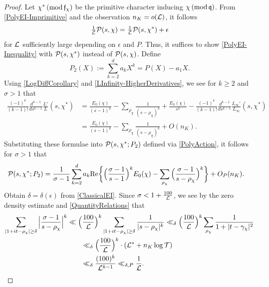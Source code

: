 \documentclass[12pt,psamsfonts]{amsart}
\theoremstyle{definition}
\theoremstyle{remark}
\numberwithin{equation}{section}
\begin{document}
\begin{proof} Let $\chi^* \, (\mathrm{mod} {\, \mathfrak{f}_{\chi}})$ be the primitive character inducing $\chi \, (\mathrm{mod} {\, \mathfrak{q}})$. From \cref{PolyEI-Imprimitive} and the observation $n_K = o(\mathcal{L})$, it follows
\[
\tfrac{1}{\mathcal{L}} \mathcal{P}(s,\chi) = \tfrac{1}{\mathcal{L}} \mathcal{P}(s,\chi^*) + \epsilon
\]
for $\mathcal{L}$ sufficiently large depending on $\epsilon$ and $P$. Thus, it suffices to show \eqref{PolyEI-Inequality} with $\mathcal{P}(s,\chi^*)$ instead of $\mathcal{P}(s,\chi)$. 
Define
\[
P_2(X) := \sum_{k=2}^d a_k X^k = P(X) - a_1X.
\]
Using \cref{LogDiffCorollary} and \cref{LInfinity-HigherDerivatives}, we see for $k \geq 2$ and $\sigma > 1$ that
\begin{align*}
\frac{(-1)^k}{(k-1)!} \frac{d^{k-1}}{ds^{k-1}} \frac{L'}{L}(s,\chi^*)  
& =   \frac{E_0(\chi)}{(s-1)^k} -\sum_{\rho_{\chi}} \frac{1}{(s-\rho_{\chi})^k } + \frac{E_0(\chi)}{s^k} - \frac{(-1)^k}{(k-1)!} \frac{d^{k-1}}{ds^{k-1}} \frac{L_{\infty}'}{L_{\infty}}(s, \chi^*)  \\
& =  \frac{E_0(\chi)}{(s-1)^k} -\sum_{\rho_{\chi}} \frac{1}{(s-\rho_{\chi})^k }  + O(n_K).
\end{align*}
Substituting these formulae into $\mathcal{P}(s,\chi^*; P_2)$ defined via \eqref{PolyAction}, it follows for $\sigma > 1$ that
\begin{equation}
\label{PolyDeg2}
\begin{aligned}
\mathcal{P}(s,\chi^*; P_2)
& =  \frac{1}{\sigma-1} \sum_{k=2}^d a_k  \mathrm{Re}\bigg\{ \Big( \frac{\sigma-1}{s-1} \Big)^k E_0(\chi) -  \sum_{\rho_{\chi}} \Big( \frac{\sigma-1}{s-\rho_{\chi} } \Big)^k \bigg\}    + O_P(n_K).
\end{aligned}
\end{equation}
Obtain $\delta = \delta(\epsilon)$ from \cref{ClassicalEI}. Since $ \sigma < 1+\tfrac{100}{\mathcal{L}}$, we see by the zero density estimate \cite[Lemma 2.1]{LMO} and \cref{QuantityRelations} that
\begin{align*}
\sum_{|1+it-\rho_{\chi}| \geq \delta} \Big| \frac{\sigma-1}{s-\rho_{\chi} } \Big|^k 
& \ll \Big( \frac{100}{\cL} \Big)^k \sum_{|1+it-\rho_{\chi}| \geq \delta} \frac{1}{|s-\rho_{\chi}|^k } 
 \ll_{\delta} \Big( \frac{100}{\cL} \Big)^k  \sum_{\rho_{\chi}}  \frac{1}{1+ |t-\gamma_{\chi}|^2}  \\
&\qquad  \ll_{\delta} \Big( \frac{100}{\cL} \Big)^k  \cdot(\cL^*+ n_K \log \cT )\\
& \qquad  \ll_{\delta} \frac{ (100)^{k} }{\cL^{k-1}} \ll_{\delta, P} \frac{1}{\cL}.

\end{align*}
\end{proof}
\end{document}
